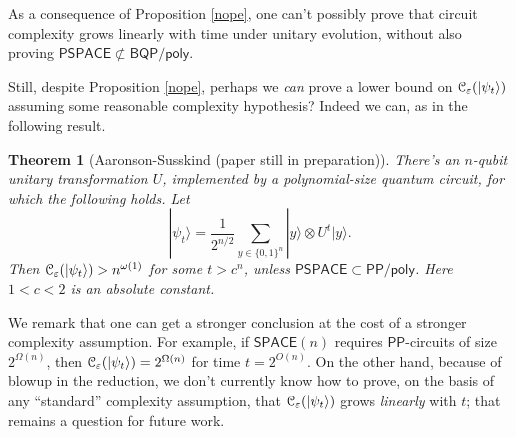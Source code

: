 \documentclass[12pt]{report}
\theoremstyle{plain}
\newtheorem{theorem}{Theorem}[section]
\theoremstyle{definition}
\newcommand{\eps}{\varepsilon}
\renewcommand{\ket}[1]{|#1\rangle}
\begin{document}
As a consequence of Proposition \ref{nope}, one can't possibly prove that circuit complexity grows linearly with time under unitary evolution, without also proving $\mathsf{PSPACE} \not\subset \mathsf{BQP/poly}$.

Still, despite Proposition \ref{nope}, perhaps we {\em can} prove a lower bound on ${\cal C}_\eps(\ket{\psi_t})$ assuming some reasonable complexity hypothesis? Indeed we can, as in the following result.

\begin{theorem}[Aaronson-Susskind (paper still in preparation)]
\label{thm:asusskind}
There's an $n$-qubit unitary transformation $U$, implemented by a polynomial-size quantum circuit, for which the following holds.  Let
\[
\ket{\psi_t} = \frac{1}{2^{n/2}} \sum_{y \in \{0,1\}^n} \ket{y} \otimes U^t \ket{y}.
\]
Then ${\cal C}_\eps(\ket{\psi_t}) > n^{\omega(1)}$ for some $t > c^n$, unless $\mathsf{PSPACE} \subset \mathsf{PP/poly}$.  Here $1<c<2$ is an absolute constant.
\end{theorem}

We remark that one can get a stronger conclusion at the cost of a stronger complexity assumption.  For example, if $\mathsf{SPACE}(n)$ requires $\mathsf{PP}$-circuits of size $2^{\Omega(n)}$, then ${\cal C}_\eps(\ket{\psi_t}) = 2^{\Omega(n)}$ for time $t=2^{O(n)}$.  On the other hand, because of blowup in the reduction, we don't currently know how to prove, on the basis of any ``standard'' complexity assumption, that ${\cal C}_\eps(\ket{\psi_t})$ grows {\em linearly} with $t$; that remains a question for future work.
\end{document}
